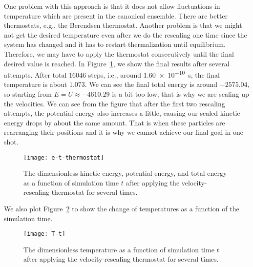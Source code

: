 One problem with this approach is that it does not
allow fluctuations in temperature which are present in the canonical ensemble.
There are better thermostats, e.g., the Berendsen thermostat.
Another problem is that we might not get the desired temperature even after we do the
rescaling one time since the system has changed and it has to restart thermalization
until equilibrium. Therefore, we may have to apply the thermostat consecutively
until the final desired value is reached.
In Figure~\ref{fig:md-thermostat}, we show the final results after several attempts.
After total $16046$ steps, i.e., around \qty{1.60e-10}{\second}, the final temperature is
about $1.073$.
We can see the final total energy is around $-2575.04$, so starting from
$E = U \approx -4610.29$ is a bit too low, that is why we are scaling up the velocities.
We can see from the figure that after the first two rescaling attempts, the potential
energy also increases a little, causing our scaled kinetic energy drops by about the
same amount. That is when these particles are rearranging their positions and
it is why we cannot achieve our final goal in one shot.

\begin{figure}
    \centering
    \texttt{[image: e-t-thermostat]}
    \caption{The dimensionless kinetic energy, potential energy, and total energy
        as a function of simulation time $t$ after applying the velocity-rescaling
        thermostat for several times.}
    \label{fig:md-thermostat}
\end{figure}

We also plot Figure~\ref{fig:T-t} to show the change of temperatures as a function
of the simulation time.

\begin{figure}
    \centering
    \texttt{[image: T-t]}
    \caption{The dimensionless temperature as a function of simulation time $t$ after
        applying the velocity-rescaling thermostat for several times.}
    \label{fig:T-t}
\end{figure}
